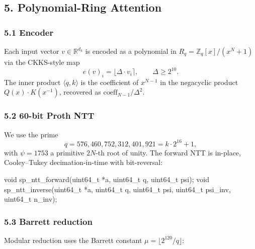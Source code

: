 \documentclass[
  11pt,
]{article}
\newenvironment{Shaded}{}{}
\newcommand{\DataTypeTok}[1]{\textcolor[rgb]{0.56,0.13,0.00}{#1}}
\newcommand{\NormalTok}[1]{#1}
\begin{document}
\hypertarget{polynomial-ring-attention}{%
\subsection{5. Polynomial-Ring
Attention}\label{polynomial-ring-attention}}

\hypertarget{encoder}{%
\subsubsection{5.1 Encoder}\label{encoder}}

Each input vector \(v \in \mathbb{R}^{d_k}\) is encoded as a polynomial
in \(R_q = \mathbb{Z}_q[x]/(x^N+1)\) via the CKKS-style map
\[e(v)_i = \lfloor \Delta \cdot v_i \rceil, \qquad \Delta \ge 2^{10}.\]
The inner product \(\langle q, k \rangle\) is the coefficient of
\(x^{N-1}\) in the negacyclic product \(Q(x) \cdot K(x^{-1})\),
recovered as \(\mathrm{coeff}_{N-1} / \Delta^2\).

\hypertarget{bit-proth-ntt}{%
\subsubsection{5.2 60-bit Proth NTT}\label{bit-proth-ntt}}

We use the prime
\[q = 576{,}460{,}752{,}312{,}401{,}921 = k \cdot 2^{16} + 1,\] with
\(\psi = 1753\) a primitive \(2N\)-th root of unity. The forward NTT is
in-place, Cooley--Tukey decimation-in-time with bit-reversal:

\begin{Shaded}
\begin{Highlighting}[]
\DataTypeTok{void}\NormalTok{ sp\_ntt\_forward(}\DataTypeTok{uint64\_t}\NormalTok{ *a, }\DataTypeTok{uint64\_t}\NormalTok{ q, }\DataTypeTok{uint64\_t}\NormalTok{ psi);}
\DataTypeTok{void}\NormalTok{ sp\_ntt\_inverse(}\DataTypeTok{uint64\_t}\NormalTok{ *a, }\DataTypeTok{uint64\_t}\NormalTok{ q, }\DataTypeTok{uint64\_t}\NormalTok{ psi, }\DataTypeTok{uint64\_t}\NormalTok{ psi\_inv, }\DataTypeTok{uint64\_t}\NormalTok{ n\_inv);}
\end{Highlighting}
\end{Shaded}

\hypertarget{barrett-reduction}{%
\subsubsection{5.3 Barrett reduction}\label{barrett-reduction}}

Modular reduction uses the Barrett constant
\(\mu = \lfloor 2^{120}/q\rfloor\):
\end{document}

